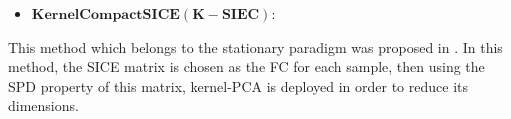 \documentclass[preprint,12pt]{elsarticle}
\begin{document}













\begin{itemize}
	\item $\mathbf{Kernel Compact SICE(K-SIEC):}$ 
\end{itemize}
This method which belongs to the stationary paradigm was proposed in \cite{r14}. In this method, the SICE matrix is chosen as the FC for each sample, then using the SPD property of this matrix, kernel-PCA is deployed in order to reduce its dimensions.
\end{document}
